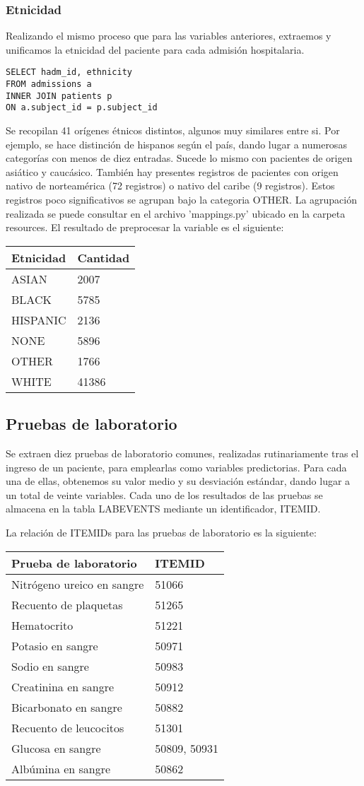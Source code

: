 \documentclass{report}
\begin{document}
\subsubsection{Etnicidad}

Realizando el mismo proceso que para las variables anteriores, extraemos
y unificamos la etnicidad del paciente para cada admisión hospitalaria.

\begin{verbatim}
SELECT hadm_id, ethnicity
FROM admissions a
INNER JOIN patients p
ON a.subject_id = p.subject_id
\end{verbatim}

Se recopilan 41 orígenes étnicos distintos, algunos muy similares entre si. Por ejemplo, se hace distinción de hispanos según el país, dando lugar a numerosas categorías con menos de diez entradas. Sucede lo mismo con pacientes de origen asiático y caucásico. También hay presentes registros de pacientes con origen nativo de norteamérica (72 registros) o nativo del caribe (9 registros). Estos registros poco significativos se agrupan bajo la categoria OTHER. La agrupación realizada se puede consultar en el archivo 'mappings.py' ubicado en la carpeta resources. El resultado de preprocesar la variable es el siguiente:

\begin{longtable}[]{@{}ll@{}}
\toprule
Etnicidad & Cantidad\tabularnewline
\midrule
\endhead
ASIAN & 2007\tabularnewline
BLACK & 5785\tabularnewline
HISPANIC & 2136\tabularnewline
NONE & 5896\tabularnewline
OTHER & 1766\tabularnewline
WHITE & 41386\tabularnewline
\bottomrule
\end{longtable}

\subsection{Pruebas de laboratorio}

Se extraen diez pruebas de laboratorio comunes, realizadas
rutinariamente tras el ingreso de un paciente, para emplearlas como
variables predictorias. Para cada una de ellas, obtenemos su valor medio y su desviación
estándar, dando lugar a un total de veinte variables. Cada uno de los resultados de las pruebas se almacena en la tabla
LABEVENTS mediante un identificador, ITEMID.

La relación de ITEMIDs para las pruebas de laboratorio es la siguiente:

\begin{longtable}[]{@{}ll@{}}
\toprule
Prueba de laboratorio & ITEMID\tabularnewline
\midrule
\endhead
Nitrógeno ureico en sangre & 51066\tabularnewline
Recuento de plaquetas & 51265\tabularnewline
Hematocrito & 51221\tabularnewline
Potasio en sangre & 50971\tabularnewline
Sodio en sangre & 50983\tabularnewline
Creatinina en sangre & 50912\tabularnewline
Bicarbonato en sangre & 50882\tabularnewline
Recuento de leucocitos & 51301\tabularnewline
Glucosa en sangre & 50809, 50931\tabularnewline
Albúmina en sangre & 50862\tabularnewline
\bottomrule
\end{longtable}
\end{document}
